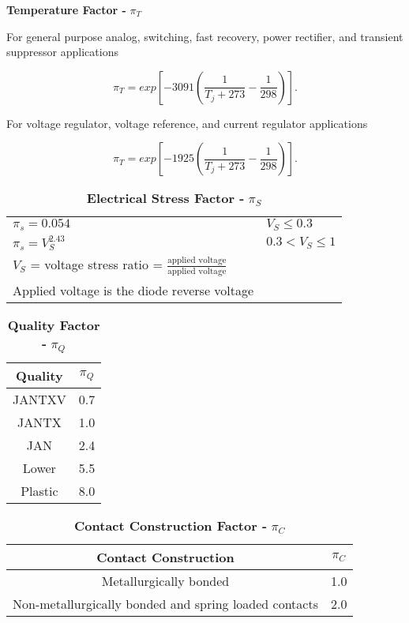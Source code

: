 \textbf{Temperature Factor -} $\pi_{T}$

For general purpose analog, switching, fast recovery, power rectifier,
and transient suppressor applications

$$\pi_{T} = exp[-3091(\frac{1}{T_{j} + 273} - \frac{1}{298})].$$

For voltage regulator, voltage reference, and current regulator
applications

$$\pi_{T} = exp[-1925(\frac{1}{T_{j} + 273} - \frac{1}{298})].$$


\begin{table}[h]
\caption{\textbf{Electrical Stress Factor -} $\pi_{S}$}
\label{table:electicalStressFactor}
\begin{tabular}{ll}
$\pi_s = 0.054$ 		& $V_{S} \leq 0.3$ \\ 
$\pi_s = V^{2.43}_{S}$ & $0.3 < V_{S} \leq 1$ \\
$V_S$ = voltage  stress ratio = $\frac{\text{applied voltage}}{\text{applied voltage}}$ \\
Applied voltage is the diode reverse voltage \\
\end{tabular}
\end{table}

\begin{table}[h]
\caption{\textbf{Quality Factor -} $\pi_{Q}$}
\label{table:qualityFactorDiode}
\begin{tabular}{|c|c|} \hline
\rowcolor{Gray}
\textbf{Quality} & $\pi_{Q}$ \\ \hline
JANTXV & 0.7 \\ \hline
JANTX & 1.0 \\ \hline
JAN & 2.4 \\ \hline
Lower & 5.5 \\ \hline
Plastic & 8.0 \\ \hline
\end{tabular}
\end{table}


\begin{table}[h]
\caption{\textbf{Contact Construction Factor -} $\pi_{C}$}
\label{table:<context>}
\begin{tabular}{|c|c|} \hline
\rowcolor{Gray}
\textbf{Contact Construction} & $\pi_{C}$ \\ \hline
Metallurgically bonded & 1.0 \\ \hline
Non-metallurgically bonded and spring loaded contacts & 2.0 \\ \hline\end{tabular}
\end{table}


